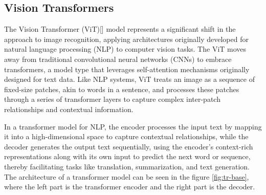 \subsection{Vision Transformers}

The Vision Transformer (ViT)[] model represents a significant shift in the approach to image recognition, applying architectures originally developed for 
natural language processing (NLP) to computer vision tasks. The ViT moves away from traditional convolutional neural networks (CNNs) to embrace transformers, 
a model type that leverages self-attention mechanisms originally designed for text data. Like NLP systems, ViT treats an image as a sequence of 
fixed-size patches, akin to words in a sentence, and processes these patches through a series of transformer layers to capture complex inter-patch 
relationships and contextual information.

In a transformer model for NLP, the encoder processes the input text by mapping it into a high-dimensional space to capture contextual relationships, while the 
decoder generates the output text sequentially, using the encoder's context-rich representations along with its own input to predict the next word or 
sequence, thereby facilitating tasks like translation, summarization, and text generation. The architecture of a transformer model can be seen in the 
figure \ref{fig:tr-base}, where the left part is the transformer encoder and the right part is the decoder.


